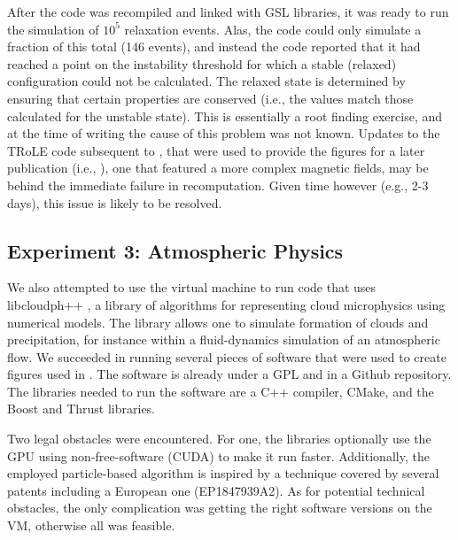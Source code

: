 After the code was recompiled and linked with GSL libraries, it was ready to run the simulation of $10^5$ relaxation
events. Alas, the code could only simulate a fraction of this total (146 events), and instead the code reported
that it had reached a point on the instability threshold for which a stable (relaxed) configuration could not be calculated.
The relaxed state is determined by ensuring that certain properties are conserved (i.e., the values match those
calculated for the unstable state). This is essentially a root finding exercise, and at the time of writing
the cause of this problem was not known. Updates to the TRoLE code subsequent to \cite{bareford2010nanoflare}, that were
used to provide the figures for a later publication (i.e., \cite{bareford2011flare}), one that featured a more complex magnetic
fields, may be behind the immediate failure in recomputation. Given time however (e.g., 2-3 days), this issue
is likely to be resolved. 

\subsection*{Experiment 3: Atmospheric Physics}

We also attempted to use the virtual machine to run code that uses libcloudph++ \cite{arabas2013libcloud}, a library of algorithms
for representing cloud microphysics using numerical models. The library allows one to simulate formation of clouds and precipitation, for instance within a fluid-dynamics simulation of an atmospheric flow. We succeeded in running several pieces of software that were used to create figures used in \cite{arabas2013libcloud}. The software is already under a GPL and in a Github repository. The libraries needed to run the software are a C++ compiler, CMake, and the Boost and Thrust libraries.

Two legal obstacles were encountered. For one, the libraries optionally use the GPU using non-free-software (CUDA) to make it run faster. Additionally, the employed particle-based algorithm is inspired by a technique covered by several patents including a European one (EP1847939A2). As for potential technical obstacles, the only complication was getting the right software versions on the VM, otherwise all was feasible.
